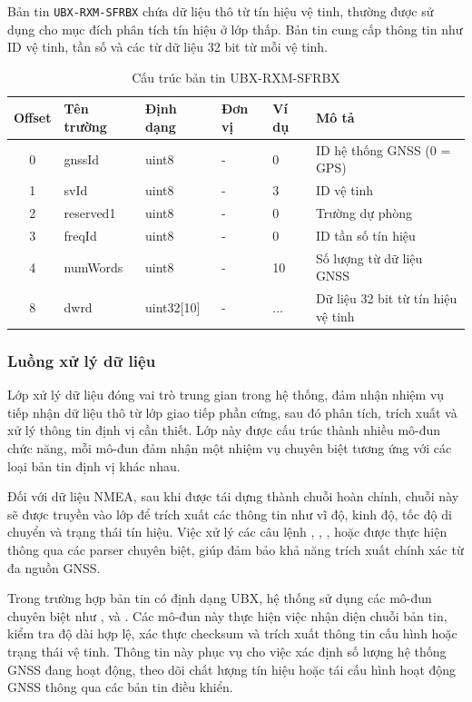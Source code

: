 \documentclass[../DoAn.tex]{subfiles}
\begin{document}
Bản tin \texttt{UBX-RXM-SFRBX} chứa dữ liệu thô từ tín hiệu vệ tinh, thường được sử dụng cho mục đích phân tích tín hiệu ở lớp thấp. Bản tin cung cấp thông tin như ID vệ tinh, tần số và các từ dữ liệu 32 bit từ mỗi vệ tinh.

\begin{table}[H]
\centering
\begin{tabular}{|c|l|l|l|l|p{6cm}|}
\hline
\textbf{Offset} & \textbf{Tên trường} & \textbf{Định dạng} & \textbf{Đơn vị} & \textbf{Ví dụ} & \textbf{Mô tả} \\
\hline
0 & gnssId & uint8 & - & 0 & ID hệ thống GNSS (0 = GPS) \\
\hline
1 & svId & uint8 & - & 3 & ID vệ tinh \\
\hline
2 & reserved1 & uint8 & - & 0 & Trường dự phòng \\
\hline
3 & freqId & uint8 & - & 0 & ID tần số tín hiệu \\
\hline
4 & numWords & uint8 & - & 10 & Số lượng từ dữ liệu GNSS \\
\hline
8 & dwrd & uint32[10] & - & ... & Dữ liệu 32 bit từ tín hiệu vệ tinh \\
\hline
\end{tabular}
\caption{Cấu trúc bản tin UBX-RXM-SFRBX}
\end{table}


\subsubsection{Luồng xử lý dữ liệu}
\label{subsubsection:4.2.3.2}
Lớp xử lý dữ liệu đóng vai trò trung gian trong hệ thống, đảm nhận nhiệm vụ tiếp nhận dữ liệu thô từ lớp giao tiếp phần cứng, sau đó phân tích, trích xuất và xử lý thông tin định vị cần thiết. Lớp này được cấu trúc thành nhiều mô-đun chức năng, mỗi mô-đun đảm nhận một nhiệm vụ chuyên biệt tương ứng với các loại bản tin định vị khác nhau.

Đối với dữ liệu NMEA, sau khi được tái dựng thành chuỗi hoàn chỉnh, chuỗi này sẽ được truyền vào lớp  để trích xuất các thông tin như vĩ độ, kinh độ, tốc độ di chuyển và trạng thái tín hiệu. Việc xử lý các câu lệnh , , , hoặc  được thực hiện thông qua các parser chuyên biệt, giúp đảm bảo khả năng trích xuất chính xác từ đa nguồn GNSS.

Trong trường hợp bản tin có định dạng UBX, hệ thống sử dụng các mô-đun chuyên biệt như ,  và . Các mô-đun này thực hiện việc nhận diện chuỗi bản tin, kiểm tra độ dài hợp lệ, xác thực checksum và trích xuất thông tin cấu hình hoặc trạng thái vệ tinh. Thông tin này phục vụ cho việc xác định số lượng hệ thống GNSS đang hoạt động, theo dõi chất lượng tín hiệu hoặc tái cấu hình hoạt động GNSS thông qua các bản tin điều khiển.
\end{document}

